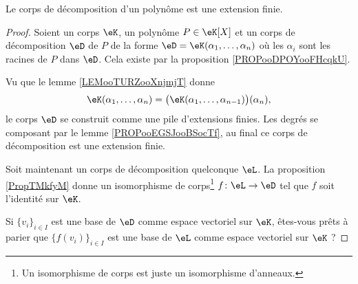 \begin{corollary}    \label{CORooELAUooPQGLkR}
    Le corps de décomposition d'un polynôme est une extension finie.
\end{corollary}

\begin{proof}
    Soient un corps \( \eK\), un polynôme \( P\in \eK[X]\) et un corps de décomposition \( \eD\) de \( P\) de la forme \( \eD=\eK(\alpha_1,\ldots, \alpha_n)\) où les \( \alpha_i\) sont les racines de \( P\) dans \( \eD\). Cela existe par la proposition \ref{PROPooDPOYooFHcqkU}.
    
    Vu que le lemme \ref{LEMooTURZooXnjmjT} donne
    \begin{equation}
        \eK(\alpha_1,\ldots, \alpha_n)=\big( \eK(\alpha_1,\ldots, \alpha_{n-1}) \big)(\alpha_n),
    \end{equation}
    le corps \( \eD\) se construit comme une pile d'extensions finies. Les degrés se composant par le lemme \ref{PROPooEGSJooBSocTf}, au final ce corps de décomposition est une extension finie.

    Soit maintenant un corps de décomposition quelconque \( \eL\). La proposition \ref{PropTMkfyM} donne un isomorphisme de corps\footnote{Un isomorphisme de corps est juste un isomorphisme d'anneaux.} \( f\colon \eL\to \eD\) tel que \( f\) soit l'identité sur \( \eK\).

    Si \( \{ v_i \}_{i\in I}\) est une base de \( \eD\) comme espace vectoriel sur \( \eK\), êtes-vous prêts à parier que \( \{ f(v_i) \}_{i\in I}\) est une base de \( \eL\) comme espace vectoriel sur \( \eK\) ?
\end{proof}

